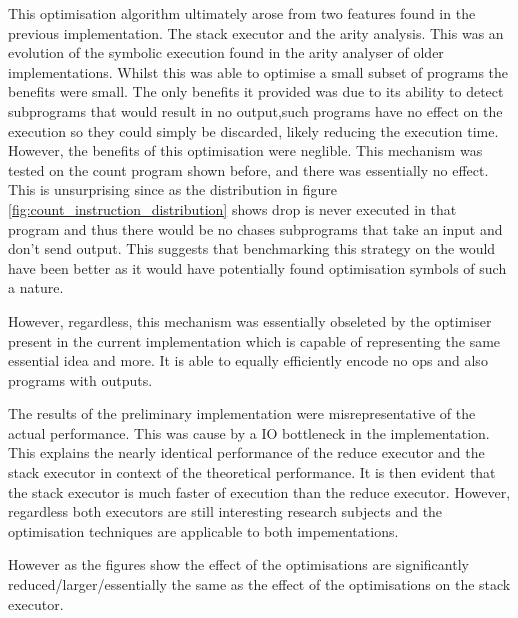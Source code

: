 This optimisation algorithm ultimately arose from two features found in the previous implementation. The stack executor and the arity analysis. This was an evolution of the symbolic execution found in the arity analyser of older implementations. Whilst this was able to optimise a small subset of programs the benefits were small. The only benefits it provided was due to its ability to detect subprograms that would result in no output,such programs have no effect on the execution so they could simply be discarded, likely reducing the execution time. However, the benefits of this optimisation were neglible. This mechanism was tested on the count program shown before, and there was essentially no effect. This is unsurprising since as the distribution in figure \ref{fig:count_instruction_distribution} shows drop is never executed in that program and thus there would be no chases subprograms that take an input and don't send output. This suggests that benchmarking this strategy on the  would have been better as it would have potentially found optimisation symbols of such a nature.

However, regardless, this mechanism was essentially obseleted by the optimiser present in the current implementation which is capable of representing the same essential idea and more. It is able to equally efficiently encode no ops and also programs with outputs.

The results of the preliminary implementation were misrepresentative of the actual performance. This was cause by a IO bottleneck in the implementation. This explains the nearly identical performance of the reduce executor and the stack executor in context of the theoretical performance. It is then evident that the stack executor is much faster of execution than the reduce executor. However, regardless both executors are still interesting research subjects and the optimisation techniques are applicable to both impementations.

However as the figures show the effect of the optimisations are significantly reduced/larger/essentially the same as the effect of the optimisations on the stack executor.

